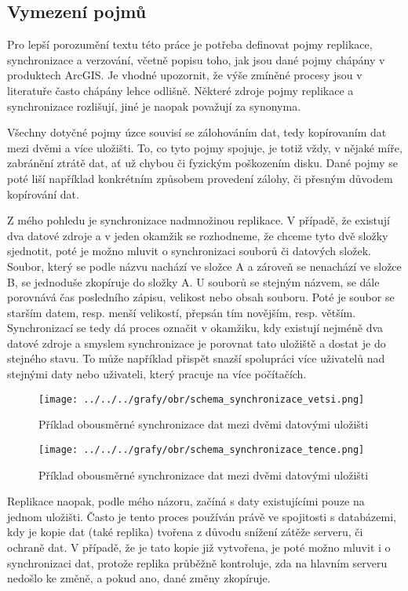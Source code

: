         \subsection{Vymezení pojmů}
        Pro lepší porozumění textu této práce je potřeba definovat pojmy replikace,
        synchronizace a verzování, včetně popisu toho, jak jsou dané pojmy chápány v
        produktech ArcGIS. Je vhodné upozornit, že výše zmíněné procesy jsou v
        literatuře často chápány lehce odlišně. Některé zdroje pojmy replikace a
        synchronizace rozlišují, jiné je naopak považují za synonyma. 

        Všechny dotyčné pojmy úzce souvisí se zálohováním dat, tedy kopírovaním dat
        mezi dvěmi a více uložišti. To, co tyto pojmy spojuje, je totiž vždy, v nějaké
        míře, zabránění ztrátě dat, ať už chybou či fyzickým poškozením disku. Dané
        pojmy se poté liší například konkrétním způsobem provedení zálohy, či přesným
        důvodem kopírování dat. 

        Z mého pohledu je synchronizace nadmnožinou replikace. V případě, že existují
        dva datové zdroje a v jeden okamžik se rozhodneme, že chceme tyto dvě složky
        sjednotit, poté je možno mluvit o synchronizaci souborů či datových složek.
        Soubor, který se podle názvu nachází ve složce A a zároveň se nenachází ve
        složce B, se jednoduše zkopíruje do složky A. U souborů se stejným názvem, se
        dále porovnává čas posledního zápisu, velikost nebo obsah souboru. Poté je
        soubor se starším datem, resp. menší velikostí, přepsán tím novějším, resp.
        větším. Synchronizací se tedy dá proces označit v okamžiku, kdy existují
        nejméně dva datové zdroje a smyslem synchronizace je porovnat tato uložiště a
        dostat je do stejného stavu. To může například přispět snazší spolupráci více
        uživatelů nad stejnými daty nebo uživateli, který pracuje na více počítačích.
          \begin{figure}[H]
            \centering
            \texttt{[image: ../../../grafy/obr/schema\_synchronizace\_vetsi.png]}
            \caption {Příklad obousměrné synchronizace dat mezi dvěmi datovými uložišti}
          \end{figure}
          \begin{figure}[H]
            \centering
            \texttt{[image: ../../../grafy/obr/schema\_synchronizace\_tence.png]}
            \caption {Příklad obousměrné synchronizace dat mezi dvěmi datovými uložišti}
          \end{figure}
        Replikace naopak, podle mého názoru, začíná s daty existujícími pouze na jednom
        uložišti. Často je tento proces používán právě ve spojitosti s databázemi, kdy
        je kopie dat (také replika) tvořena z důvodu snížení zátěže serveru, či ochraně
        dat. V případě, že je tato kopie již vytvořena, je poté možno mluvit i o
        synchronizaci dat, protože replika průběžně kontroluje, zda na hlavním serveru
        nedošlo ke změně, a pokud ano, dané změny zkopíruje.

